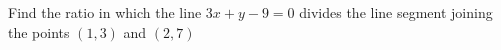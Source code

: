 
%
%
%
%
% 

\question[5] Find the ratio in which the line $3x+y-9=0$ divides the line segment 
joining the points $(1,3)$ and $(2,7)$

\ifprintanswers
\fi 

